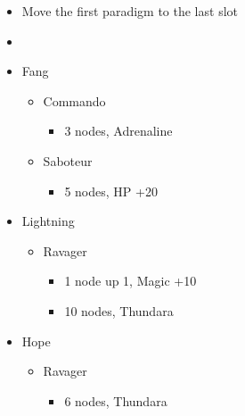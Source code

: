 	\begin{menu}
		\begin{itemize}
			\paradigm
			\begin{itemize}
				\item Move the first paradigm to the last slot
				\item {}%
				      {\paradigmline{[\com]}{\com}{\rav}}
				      {\paradigmline{\com}{\rav}{(\rav)}}%
				      {\paradigmline[3]{\textit{(\sab)}}{\textit{(\rav)}}{\textit{\rav}}}%
				      {\paradigmline{\sen}{(\rav)}{(\rav)}}%
				      {\paradigmline{\sab}{(\rav)}{\syn}}%
				      {\paradigmline{\com}{\rav}{\rav}}
			\end{itemize}
			\crystarium
			\begin{itemize}
				\item Fang
				      \begin{itemize}
					      \item Commando
					            \begin{itemize}
						            \item 3 nodes, Adrenaline
					            \end{itemize}
					      \item Saboteur
					            \begin{itemize}
						            \item 5 nodes, HP +20
					            \end{itemize}
				      \end{itemize}
				\item Lightning
				      \begin{itemize}
					      \item Ravager
					            \begin{itemize}
						            \item 1 node up 1, Magic +10
						            \item 10 nodes, Thundara
					            \end{itemize}
				      \end{itemize}
				\item Hope
				      \begin{itemize}
					      \item Ravager
					            \begin{itemize}
						            \item 6 nodes, Thundara
					            \end{itemize}
				      \end{itemize}

\end{itemize}
\end{itemize}
\end{menu}
